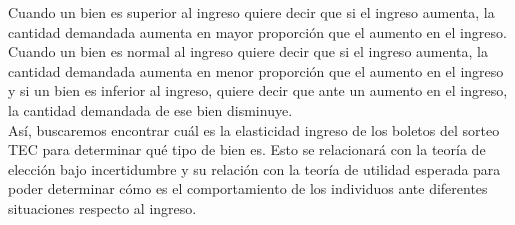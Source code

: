 Cuando un bien es superior al ingreso quiere decir que si el ingreso aumenta, la cantidad demandada aumenta en mayor proporción que el aumento en el ingreso. Cuando un bien es normal al ingreso quiere decir que si el ingreso aumenta, la cantidad demandada aumenta en menor proporción que el aumento en el ingreso y si un bien es inferior al ingreso, quiere decir que ante un aumento en el ingreso, la cantidad demandada de ese bien disminuye. \\

Así, buscaremos encontrar cuál es la elasticidad ingreso de los boletos del sorteo TEC para determinar qué tipo de bien es. Esto se relacionará con la teoría de elección bajo incertidumbre y su relación con la teoría de utilidad esperada para poder determinar cómo es el comportamiento de los individuos ante diferentes situaciones respecto al ingreso. \\






